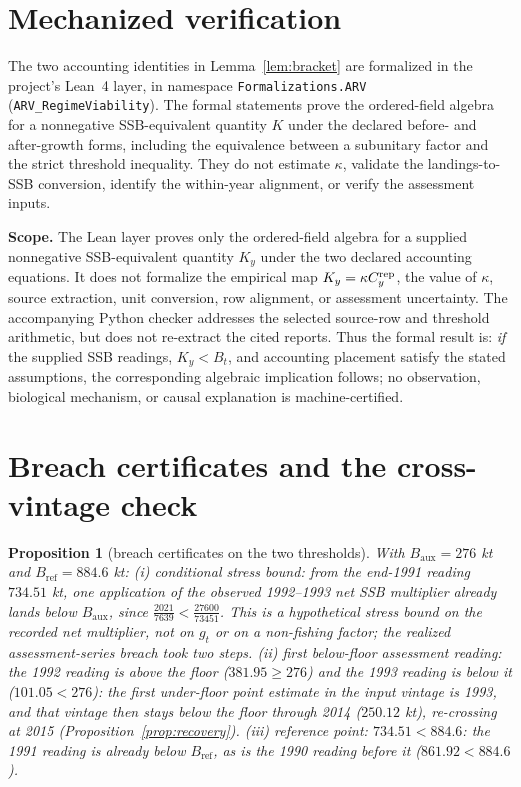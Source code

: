 \documentclass[10pt,twocolumn]{article}
\theoremstyle{plain}
\newtheorem{proposition}[theorem]{Proposition}
\theoremstyle{remark}
\begin{document}
\section{Mechanized verification}
\label{mech}

The two accounting identities in Lemma~\ref{lem:bracket} are formalized in the project's Lean~4 layer, in namespace \texttt{Formalizations.ARV} (\texttt{ARV\_RegimeViability}). The formal statements prove the ordered-field algebra for a nonnegative SSB-equivalent quantity \(K\) under the declared before- and after-growth forms, including the equivalence between a subunitary factor and the strict threshold inequality. They do not estimate \(\kappa\), validate the landings-to-SSB conversion, identify the within-year alignment, or verify the assessment inputs.

\noindent\textbf{Scope.} The Lean layer proves only the ordered-field algebra for a supplied nonnegative SSB-equivalent quantity \(K_y\) under the two declared accounting equations. It does not formalize the empirical map \(K_y=\kappa C_y^{\rm rep}\), the value of \(\kappa\), source extraction, unit conversion, row alignment, or assessment uncertainty. The accompanying Python checker addresses the selected source-row and threshold arithmetic, but does not re-extract the cited reports. Thus the formal result is: \emph{if} the supplied SSB readings, \(K_y<B_t\), and accounting placement satisfy the stated assumptions, the corresponding algebraic implication follows; no observation, biological mechanism, or causal explanation is machine-certified.

\section{Breach certificates and the cross-vintage check}\label{breach}

\begin{proposition}[breach certificates on the two thresholds]
\label{prop:breach}
With \(B_{\mathrm{aux}} = 276\) kt and \(B_{\mathrm{ref}} = 884.6\)
kt: (i) \emph{conditional stress bound}: from the end-1991 reading
\(734.51\) kt, one application of the observed 1992--1993 net SSB
multiplier already lands below \(B_{\mathrm{aux}}\), since
\(\tfrac{2021}{7639} < \tfrac{27600}{73451}\). This is a hypothetical
stress bound on the recorded net multiplier, not on \(g_t\) or on a
non-fishing factor; the realized assessment-series breach took two steps.
(ii) \emph{first below-floor assessment reading}: the 1992 reading is
above the floor (\(381.95 \ge 276\)) and the 1993 reading is below it
(\(101.05 < 276\)): the first under-floor point estimate in the input
vintage is 1993, and that vintage then stays below the floor through
2014 (\(250.12\) kt), re-crossing at 2015
(Proposition~\ref{prop:recovery}). (iii) \emph{reference point}:
\(734.51 < 884.6\): the 1991 reading is already below
\(B_{\mathrm{ref}}\), as is the 1990 reading before it
(\(861.92 < 884.6\)).
\end{proposition}
\end{document}
